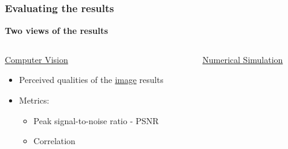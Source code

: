 \documentclass[18pt]{beamer}
\begin{document}
\begin{frame}[t]
  \frametitle{Evaluating the results}
  \begin{center}
    \textbf{\Large Two views of the results}
  \end{center}
  \vspace{-1cm}
  \begin{columns}[t]
    \begin{column}{0.5\textwidth}
      \begin{center}
        {\large \underline{Computer Vision}}
        \begin{itemize}
        \item Perceived qualities of the \underline{image} results
        \item Metrics:
          \begin{itemize}
          \item Peak signal-to-noise ratio - PSNR
          \item Correlation
          \end{itemize}
        \end{itemize}
      \end{center}
    \end{column}
    \begin{column}{0.5\textwidth}
      \begin{center}
        {\large \underline{Numerical Simulation}}
      \end{center}  
    \end{column}
  \end{columns}
\end{frame}
\end{document}

